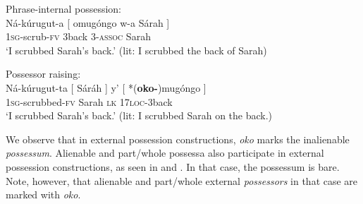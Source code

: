 \documentclass[output=paper]{langscibook}
\begin{document}
\ea \label{ex:schneider:illustratepossession}
\begin{xlist}

\ex \label{ex:schneider:illustrateinternal}
Phrase-internal possession:\\
\gll Ná-kúrugut-a  [ omug\'ongo w-a Sárah ]\\
\textsc{1sg}-scrub-\textsc{fv} {} 3back 3-\textsc{assoc} Sarah\\
\glt  `I scrubbed Sarah's back.' (lit: I scrubbed the back of Sarah)

\ex \label{ex:schneider:illustrateexternal}
Possessor raising:\\
\gll Ná-kúrugut-ta [ Sáráh ] y' [ *(\textbf{oko-})mug\'ongo ] \\
\textsc{1sg}-scrubbed-\textsc{fv} {} Sarah {} \textsc{lk} {} \textsc{17loc}-3back {} \\
\glt  `I scrubbed Sarah's back.' (lit: I scrubbed Sarah on the back.)

\end{xlist}
\z

We observe that in external possession constructions, \textit{oko} marks the inalienable \textit{possessum}. Alienable and part/whole possessa also participate in external possession constructions, as seen in   and . In that case, the possessum is bare. Note, however, that alienable and part/whole external \textit{possessors} in that case are marked with \textit{oko}. 
\end{document}
